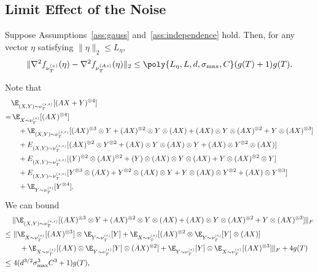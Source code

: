 \subsection{Limit Effect of the Noise} 
\label{subsec:denoise}
\begin{prop}
 \label{prop:denoise}
 Suppose Assumptions~\ref{ass:gauss} and~\ref{ass:independence} hold. Then,
for any vector $\eta$ satisfying $\|\eta\|_2\le L_{\eta}$,
\[
\| \nabla^2f_{\nu_T^{(x)}}(\eta) - \nabla^2f_{\nu_T^{(As)}}(\eta) \|_2 \le \poly{L_{\eta}, L, d, \sigma_{\max}, C}(g(T)+1)g(T). 
\] 
\end{prop}
Note that 
\begin{align*}
& \E_{(X,Y)\sim \nu_T^{(s,\epsilon)}} [(AX+Y)^{\otimes 4}]\\
 = & \,\E_{X\sim \nu_T^{(s)}}[(AX)^{\otimes 4}] \\
& \quad+ \E_{(X,Y)\sim \nu_T^{(s,\epsilon)}} [(AX)^{\otimes 3}\otimes Y + (AX)^{\otimes 2}\otimes Y\otimes (AX) + (AX)\otimes Y\otimes (AX)^{\otimes 2} + Y\otimes (AX)^{\otimes 3}] \\
& \quad+ E_{(X,Y)\sim \nu_T^{(s,\epsilon)}} [ (AX)^{\otimes 2}\otimes Y^{\otimes 2} + (AX)\otimes Y\otimes (AX)\otimes Y + (AX)\otimes Y^{\otimes 2}\otimes (AX)]\\
& \quad+  E_{(X,Y)\sim \nu_T^{(s,\epsilon)}} [ (Y)^{\otimes 2}\otimes (AX)^{\otimes 2} + (Y)\otimes (AX)\otimes Y\otimes (AX) + Y\otimes (AX)^{\otimes 2}\otimes Y] \\
& \quad+ E_{(X,Y)\sim \nu_T^{(s,\epsilon)}} [Y^{\otimes 3}\otimes (AX) + Y^{\otimes 2}\otimes (AX)\otimes Y + Y\otimes (AX)\otimes Y^{\otimes 2} + (AX)\otimes Y^{\otimes 3}] \\
& \quad+ \E_{Y\sim \nu_T^{(\epsilon)}}[Y^{\otimes 4}].
\end{align*}
We can bound
\begin{align*}
& \| \E_{(X,Y)\sim \nu_T^{(s,\epsilon)}} [(AX)^{\otimes 3}\otimes Y + (AX)^{\otimes 2}\otimes Y\otimes (AX) + (AX)\otimes Y\otimes (AX)^{\otimes 2} + Y\otimes (AX)^{\otimes 3}] \|_F \\
\le \,& \,  \| \E_{X\sim \nu_T^{(s)}} [(AX)^{\otimes 3}] \otimes \E_{Y\sim \nu_T^{(\epsilon)}}[Y] + \E_{X\sim \nu_T^{(s)}} [(AX)^{\otimes 2} \otimes \E_{Y\sim \nu_T^{(\epsilon)}}[Y] \otimes (AX)] \\
& \quad + \E_{X\sim \nu_T^{(s)}} [(AX) \otimes \E_{Y\sim \nu_T^{(\epsilon)}}[Y] \otimes (AX)^{\otimes 2}]  + \E_{Y\sim \nu_T^{(\epsilon)}}[Y] \otimes \E_{X\sim \nu_T^{(s)}} [(AX)^{\otimes 3}] \|_F + 4g(T) \\
\le \, & \,4(d^{3/2}\sigma^3_{\max}C^3 +1)g(T),
\end{align*}

